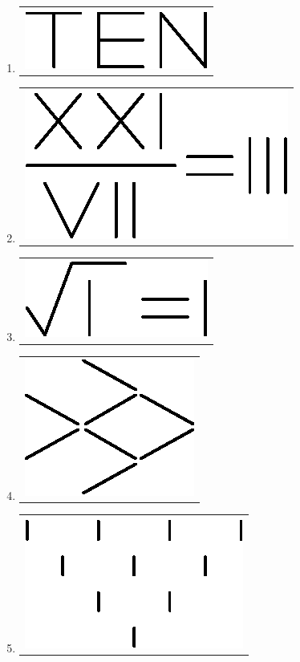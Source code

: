 \begin{enumerate}
\item 
\begin{tabular}[c]{c}
\centering
\includegraphics{src/figures/ans38.eps}
\end{tabular}

\item 
\begin{tabular}[c]{c}
\centering
\includegraphics{src/figures/ans39.eps}
\end{tabular}

\item 
\begin{tabular}[c]{c}
\centering
\includegraphics{src/figures/ans40.eps}
\end{tabular}

\item 
\begin{tabular}[c]{c}
\centering
\includegraphics{src/figures/ans41.eps}
\end{tabular}

\item 
\begin{tabular}[c]{c}
\centering
\includegraphics{src/figures/ans42.eps}
\end{tabular}


\end{enumerate}
